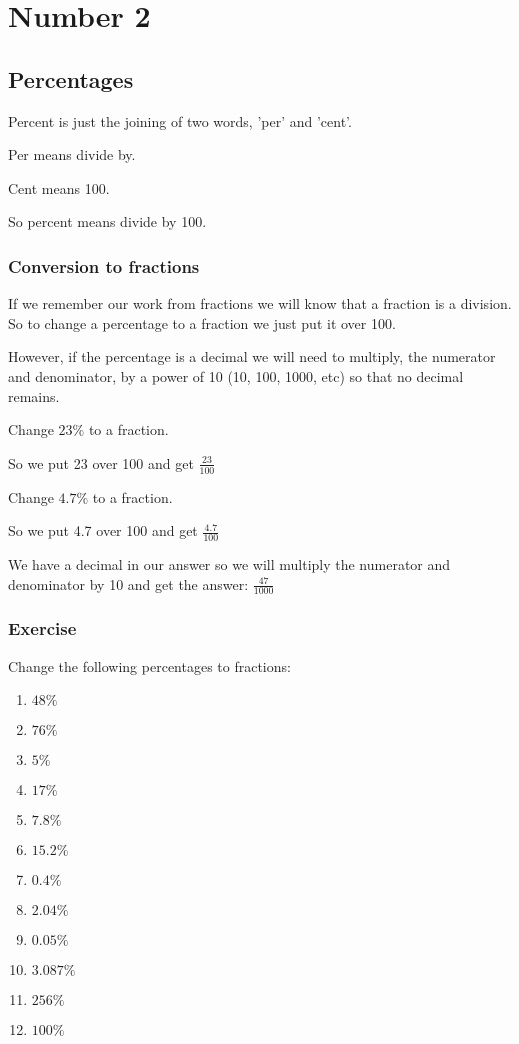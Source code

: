 \chapter{Number 2}
\section{Percentages}
Percent is just the joining of two words, 'per' and 'cent'.

Per means divide by.

Cent means 100.

So percent means divide by 100.

\subsection{Conversion to fractions}
If we remember our work from fractions we will know that a fraction is a division. So to change a percentage to a fraction we just put it over 100.

However, if the percentage is a decimal we will need to multiply, the numerator and denominator, by a power of 10 (10, 100, 1000, etc) so that no decimal remains.

\begin{exmp}
Change $23\%$ to a fraction.

\bigskip
\noindent So we put 23 over 100 and get $\displaystyle \frac{23}{100}$
\end{exmp}

\begin{exmp}
Change $4.7\%$ to a fraction.

\bigskip
\noindent So we put 4.7 over 100 and get $\displaystyle \frac{4.7}{100}$

\noindent We have a decimal in our answer so we will multiply the numerator and denominator by 10 and get the answer:
\bigskip
$\displaystyle \frac{47}{1000}$
\end{exmp}
\subsection{Exercise}
Change the following percentages to fractions:
\begin{multicols}{4}
\begin{enumerate}
	\item $48\%$
	\item $76\%$
	\item $5\%$
	\item $17\%$
	\item $7.8\%$
	\item $15.2\%$
	\item $0.4\%$
	\item $2.04\%$
	\item $0.05\%$
	\item $3.087\%$
	\item $256\%$
	\item $100\%$
\end{enumerate}
\end{multicols}
